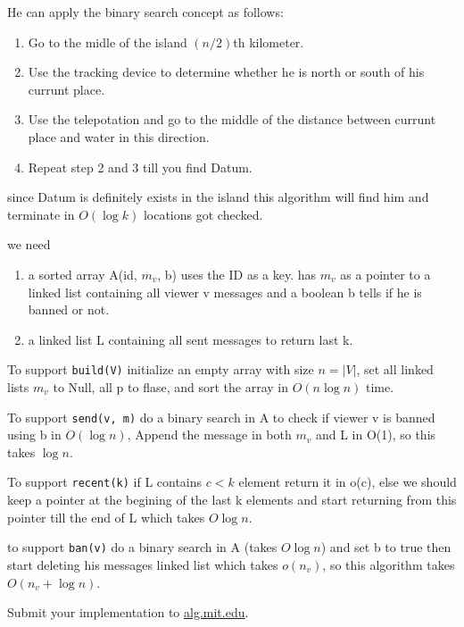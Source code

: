 \documentclass[12pt,twoside]{article}
\begin{document}
\begin{problems}
\begin{problemparts}
\end{problemparts}

\newpage
\problem  %
He can apply the binary search concept as follows: 
\begin{enumerate}
  \item  Go to the midle of the island $(n / 2)$th kilometer.
  \item  Use the tracking device to determine whether he is north or south of his currunt place. 
  \item  Use the telepotation and go to the middle of the distance between currunt place and water in this direction.
  \item Repeat step 2 and 3 till you find Datum.
\end{enumerate}
since Datum is definitely exists in the island this algorithm will find him and terminate in $O(\log{k})$ 
locations got checked.

\newpage
\problem  %
we need
\begin{enumerate}
  \item a sorted array A(id, $m_v$, b) uses the ID as a key. has $m_v$ as a pointer to a linked list containing
  all viewer v messages and a boolean b tells if he is banned or not. 
  \item a linked list L containing all sent messages to return last k. 
\end{enumerate}
To support {\tt build(V)} initialize an empty array with size $n = |V|$, set all linked lists $m_v$ to Null, 
all p to flase, and sort the array in $O(n \log{n})$ time. 

To support {\tt send(v, m)} do a binary search in A to check if viewer v is banned using b in $O(\log{n})$, Append the 
message in both $m_v$ and L in O(1), so this takes $\log{n}$.

To support {\tt recent(k)} if L contains $c < k$ element return it in o(c), else we should keep a pointer at the 
begining of the last k elements and start returning from this pointer till the end of L which takes $O{\log{n}}$. 

to support {\tt ban(v)} do a binary search in A (takes $O{\log{n}}$) and set b to true then start deleting his messages linked list
which takes $o(n_v)$, so this algorithm takes $O(n_v + \log{n})$. 


\newpage
\problem  %

\begin{problemparts}
\problempart %
\problempart %
\problempart Submit your implementation to {\small\url{alg.mit.edu}}.
\end{problemparts}

\end{problems}
\end{document}
